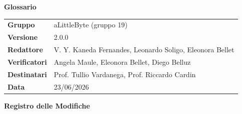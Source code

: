 \documentclass[a4paper,12pt]{article}
\begin{document}
\thispagestyle{firstpage}

\vspace*{0.5cm}

\begin{center}
    {\LARGE \textbf{Glossario}}
\end{center}

\vspace{1.5cm}

\begin{center}
    \renewcommand{\arraystretch}{1.3}
    \begin{tcolorbox}[
        width=0.92\textwidth,
        colback=gray!6,
        colframe=gray!45,
        boxrule=0.5pt,
        arc=2mm,
        boxsep=0pt,
        left=8pt, right=8pt, top=8pt, bottom=8pt
    ]
        \begin{tabularx}{\linewidth}{>{\bfseries}p{3.5cm} X}
            Gruppo      & aLittleByte (gruppo 19) \\
            Versione & 2.0.0 \\
            Redattore   & V. Y. Kaneda Fernandes, Leonardo Soligo, Eleonora Bellet \\
            Verificatori & Angela Maule, Eleonora Bellet, Diego Belluz\\
            Destinatari & Prof. Tullio Vardanega, Prof. Riccardo Cardin \\
            Data        & 23/06/2026
        \end{tabularx}
    \end{tcolorbox}
\end{center}

\newpage
{}

\begin{center}
    {\Large \textbf{Registro delle Modifiche}}
\end{center}

\vspace{0.35cm}
\end{document}
